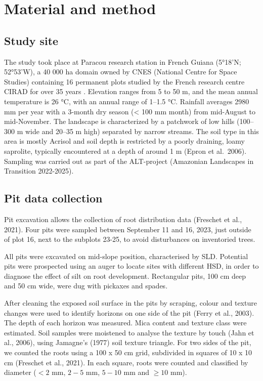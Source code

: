 \documentclass[fleqn,10pt]{latex/stylish_article} %
\begin{document}
\hypertarget{material-and-method}{%
\section{Material and method}\label{material-and-method}}

\hypertarget{study-site}{%
\subsection{Study site}\label{study-site}}

The study took place at Paracou research station in French Guiana (5°18'N; 52°53'W), a 40 000 ha domain owned by CNES (National Centre for Space Studies) containing 16 permanent plots studied by the French research centre CIRAD for over 35 years . Elevation ranges from 5 to 50 m, and the mean annual temperature is 26 °C, with an annual range of 1--1.5 °C. Rainfall averages 2980 mm per year with a 3-month dry season (\textless{} 100 mm month) from mid-August to mid-November. The landscape is characterized by a patchwork of low hills (100--300 m wide and 20--35 m high) separated by narrow streams. The soil type in this area is mostly Acrisol and soil depth is restricted by a poorly draining, loamy saprolite, typically encountered at a depth of around 1 m (Epron et al.~2006).
Sampling was carried out as part of the ALT-project (Amazonian Landscapes in Transition 2022-2025).

\hypertarget{pit-data-collection}{%
\subsection{Pit data collection}\label{pit-data-collection}}

Pit excavation allows the collection of root distribution data (Freschet et al., 2021). Four pits were sampled between September 11 and 16, 2023, just outside of plot 16, next to the subplots 23-25, to avoid disturbances on inventoried trees.

All pits were excavated on mid-slope position, characterised by SLD. Potential pits were prospected using an auger to locate sites with different HSD, in order to diagnose the effect of silt on root development. Rectangular pits, 100 cm deep and 50 cm wide, were dug with pickaxes and spades.

After cleaning the exposed soil surface in the pits by scraping, colour and texture changes were used to identify horizons on one side of the pit (Ferry et al., 2003). The depth of each horizon was measured. Mica content and texture class were estimated. Soil samples were moistened to analyse the texture by touch (Jahn et al., 2006), using Jamagne's (1977) soil texture triangle. For two sides of the pit, we counted the roots using a 100 x 50 cm grid, subdivided in squares of 10 x 10 cm (Freschet et al., 2021). In each square, roots were counted and classified by diameter (\(< 2\) mm, \(2-5\) mm, \(5-10\) mm and \(≥ 10\) mm).
\end{document}
